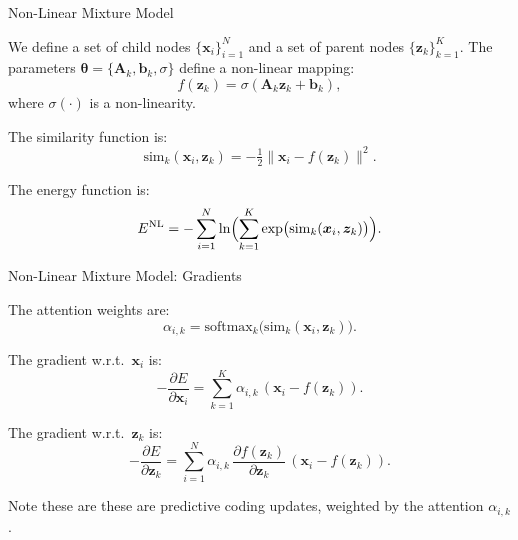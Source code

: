 \documentclass{beamer}
\begin{document}
\begin{frame}{Non-Linear Mixture Model}

    We define a set of child nodes \(\{\bm{x}_i\}_{i=1}^N\) and a set of parent nodes \(\{\bm{z}_k\}_{k=1}^K\). The parameters \(\bm{\theta} = \{\bm{A}_k, \bm{b}_k, \sigma\}\) define a non-linear mapping:
    \[
    f(\bm{z}_k) = \sigma(\bm{A}_k \bm{z}_k + \bm{b}_k),
    \]
    where \(\sigma(\cdot)\) is a non-linearity.

    \bigskip

    The similarity function is:
    \[
    \mathrm{sim}_k(\bm{x}_i, \bm{z}_k)
    =
    -\tfrac{1}{2} \|\bm{x}_i - f(\bm{z}_k)\|^2.
    \]

    The energy function is:
    \[
    E^{\mathrm{NL}}
    =
    -\sum_{i=1}^{N}
    \ln \Bigl(\sum_{k=1}^K
    \exp\bigl(\mathrm{sim}_k(\bm{x}_i, \bm{z}_k)\bigr)\Bigr).
    \]

\end{frame}

\begin{frame}{Non-Linear Mixture Model: Gradients}

    The attention weights are:
    \[
    \alpha_{i,k} = \mathrm{softmax}_k\bigl(\mathrm{sim}_k(\bm{x}_i, \bm{z}_k)\bigr).
    \]

    The gradient w.r.t.\ \(\bm{x}_i\) is:
    \[
    -\frac{\partial E}{\partial \bm{x}_i}
    =
    \sum_{k=1}^{K} \alpha_{i,k} \,(\bm{x}_i - f(\bm{z}_k)).
    \]

    The gradient w.r.t.\ \(\bm{z}_k\) is:
    \[
    -\frac{\partial E}{\partial \bm{z}_k}
    =
    \sum_{i=1}^{N} \alpha_{i,k} \,\frac{\partial f(\bm{z}_k)}{\partial \bm{z}_k} \,(\bm{x}_i - f(\bm{z}_k)).
    \]

    Note these are these are predictive coding updates, weighted by the attention \(\alpha_{i,k}\).

\end{frame}
\end{document}
